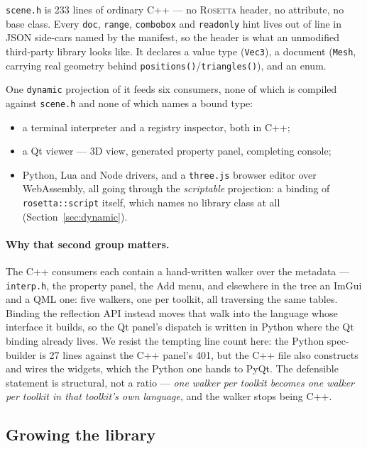 \documentclass[11pt,a4paper]{article}
\newcommand{\rosetta}{\textsc{Rosetta}}
\newcommand{\code}[1]{\texttt{\small #1}}
\begin{document}
\code{scene.h} is 233 lines of ordinary C++ --- no \rosetta{} header, no
attribute, no base class. Every \code{doc}, \code{range}, \code{combobox} and
\code{readonly} hint lives out of line in JSON side-cars named by the manifest,
so the header is what an unmodified third-party library looks like. It declares
a value type (\code{Vec3}), a document (\code{Mesh}, carrying real geometry
behind \code{positions()}/\code{triangles()}), and an enum.

One \code{dynamic} projection of it feeds six consumers, none of which is
compiled against \code{scene.h} and none of which names a bound type:

\begin{itemize}\setlength{\itemsep}{1pt}
  \item a terminal interpreter and a registry inspector, both in C++;
  \item a Qt viewer --- 3D view, generated property panel, completing console;
  \item Python, Lua and Node drivers, and a \code{three.js} browser editor over
        WebAssembly, all going through the \emph{scriptable} projection: a
        binding of \code{rosetta::script} itself, which names no library class
        at all (Section~\ref{sec:dynamic}).
\end{itemize}

\paragraph{Why that second group matters.} The C++ consumers each contain a
hand-written walker over the metadata --- \code{interp.h}, the property panel,
the Add menu, and elsewhere in the tree an ImGui and a QML one: five walkers,
one per toolkit, all traversing the same tables. Binding the reflection API
instead moves that walk into the language whose interface it builds, so the Qt
panel's dispatch is written in Python where the Qt binding already lives. We
resist the tempting line count here: the Python spec-builder is 27 lines against
the C++ panel's 401, but the C++ file also constructs and wires the widgets,
which the Python one hands to PyQt. The defensible statement is structural, not
a ratio --- \emph{one walker per toolkit becomes one walker per toolkit in that
toolkit's own language}, and the walker stops being C++.

\subsection{Growing the library}
\end{document}
